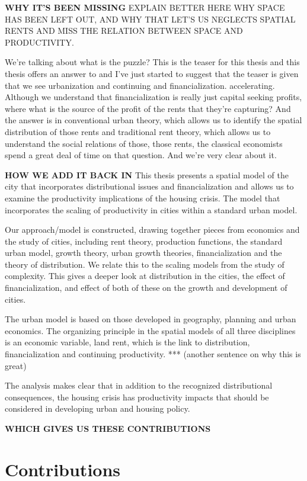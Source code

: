 \textbf{WHY IT'S BEEN MISSING}
EXPLAIN BETTER HERE WHY SPACE HAS BEEN LEFT OUT, AND WHY THAT LET'S US NEGLECTS SPATIAL RENTS AND MISS THE RELATION BETWEEN SPACE AND PRODUCTIVITY.

We're talking about what is the puzzle? This is the teaser for this thesis and this thesis offers an answer to and I've just started to suggest that the teaser is given that we see urbanization and continuing and financialization. accelerating. Although we understand that financialization is really just capital seeking profits, where what is the source of the profit of the rents that they're capturing? And the answer is in conventional urban theory, which allows us to identify the spatial distribution of those rents and traditional rent theory, which allows us to understand the social relations of those, those rents, the classical economists spend a great deal of time on that question. And we're very clear about it.

\textbf{HOW WE ADD IT BACK IN}
This thesis presents a spatial model of the city that incorporates distributional issues and financialization and allows us to examine the productivity implications of the housing crisis. The model that incorporates the scaling of productivity in cities within a standard urban model. 

Our approach/model is constructed, drawing together pieces from %
economics and the study of cities, including rent theory, production functions, the standard urban model, growth theory, urban growth theories, financialization and the theory of distribution.
We relate this to the scaling models from the study of complexity. This gives a deeper look at distribution in the cities, the effect of financialization, and effect of both of these on the growth and development of cities. 

The urban model is based on those developed in geography, planning and urban economics. The organizing principle in  the spatial models of all three disciplines is an economic variable, land rent, which is the link to distribution, financialization and continuing productivity. *** (another sentence on why this is great)

The analysis makes clear that in addition to the recognized distributional consequences, the housing crisis has productivity impacts that should be considered in developing urban and housing policy. 

\textbf{WHICH GIVES US THESE CONTRIBUTIONS}
\section{Contributions}

